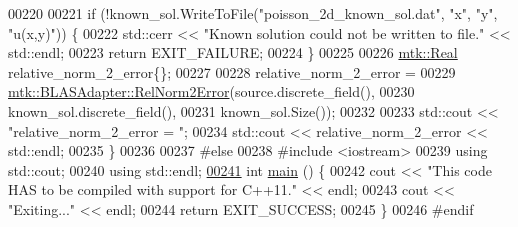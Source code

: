 \begin{DoxyCode}
00220 
00221   \textcolor{keywordflow}{if} (!known\_sol.WriteToFile(\textcolor{stringliteral}{"poisson\_2d\_known\_sol.dat"}, \textcolor{stringliteral}{"x"}, \textcolor{stringliteral}{"y"}, \textcolor{stringliteral}{"u(x,y)"})) \{
00222     std::cerr << \textcolor{stringliteral}{"Known solution could not be written to file."} << std::endl;
00223     \textcolor{keywordflow}{return} EXIT\_FAILURE;
00224   \}
00225 
00226   \hyperlink{group__c01-roots_gac080bbbf5cbb5502c9f00405f894857d}{mtk::Real} relative\_norm\_2\_error\{\};
00227 
00228   relative\_norm\_2\_error =
00229     \hyperlink{classmtk_1_1BLASAdapter_af2ac5691f45e67d6e26186b071119ec4}{mtk::BLASAdapter::RelNorm2Error}(source.discrete\_field(),
00230                                     known\_sol.discrete\_field(),
00231                                     known\_sol.Size());
00232 
00233   std::cout << \textcolor{stringliteral}{"relative\_norm\_2\_error = "};
00234   std::cout << relative\_norm\_2\_error << std::endl;
00235 \}
00236 
00237 \textcolor{preprocessor}{#else}
00238 \textcolor{preprocessor}{#include <iostream>}
00239 \textcolor{keyword}{using} std::cout;
00240 \textcolor{keyword}{using} std::endl;
\hypertarget{poisson__2d_8cc_source_l00241}{}\hyperlink{poisson__2d_8cc_ae66f6b31b5ad750f1fe042a706a4e3d4}{00241} \textcolor{keywordtype}{int} \hyperlink{poisson__2d_8cc_ae66f6b31b5ad750f1fe042a706a4e3d4}{main} () \{
00242   cout << \textcolor{stringliteral}{"This code HAS to be compiled with support for C++11."} << endl;
00243   cout << \textcolor{stringliteral}{"Exiting..."} << endl;
00244   \textcolor{keywordflow}{return} EXIT\_SUCCESS;
00245 \}
00246 \textcolor{preprocessor}{#endif}
\end{DoxyCode}
